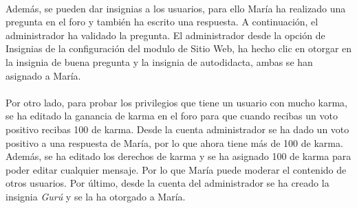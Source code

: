 \paragraph{}
Además, se pueden dar insignias a los usuarios, para ello María ha realizado una pregunta en el foro y también ha escrito una respuesta. A continuación, el administrador ha validado la pregunta. El administrador desde la opción de Insignias de la configuración del modulo de Sitio Web, ha hecho clic en otorgar en la insignia de buena pregunta y la insignia de autodidacta, ambas se han asignado a María. 
\paragraph{}
Por otro lado, para probar los privilegios que tiene un usuario con mucho karma, se ha editado la ganancia de karma en el foro para que cuando recibas un voto positivo recibas 100 de karma. Desde la cuenta administrador se ha dado un voto positivo a una respuesta de María, por lo que ahora tiene más de 100 de karma. Además, se ha editado los derechos de karma y se ha asignado 100 de karma para poder editar cualquier mensaje. Por lo que María puede moderar el contenido de otros usuarios. Por último, desde la cuenta del administrador se ha creado la insignia \textit{Gurú} y se la ha otorgado a María. 
